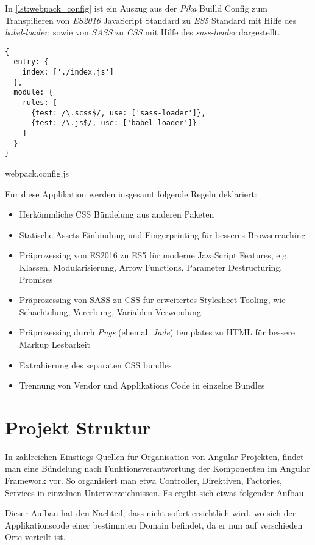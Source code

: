 In \ref{lst:webpack_config} ist ein Auszug aus der \textit{Pika} Builld Config zum Transpilieren von  \textit{ES2016} JavaScript Standard zu \textit{ES5} Standard mit Hilfe des \textit{babel-loader}, sowie von  \textit{SASS} zu \textit{CSS} mit Hilfe des \textit{sass-loader} dargestellt.


\begin{listing}[H]
\begin{verbatim}
{
  entry: {
    index: ['./index.js']
  },
  module: {
    rules: [
      {test: /\.scss$/, use: ['sass-loader']},
      {test: /\.js$/, use: ['babel-loader']}
    ]
  }
}
\end{verbatim}
\caption{webpack.config.js}
\label{lst:webpack_config}
\end{listing}

Für diese Applikation werden insgesamt folgende Regeln deklariert:

\begin{itemize}
 \item Herkömmliche CSS Bündelung aus anderen Paketen
 \item Statische Assets Einbindung und Fingerprinting für besseres Browsercaching
 \item Präprozessing von ES2016 zu ES5 für moderne JavaScript Features, e.g. Klassen, Modularisierung, Arrow Functions, Parameter Destructuring, Promises   
 \item Präprozessing von SASS zu CSS für erweitertes Stylesheet Tooling, wie Schachtelung, Vererbung, Variablen Verwendung
 \item Präprozessing durch \textit{Pugs} (ehemal. \textit{Jade}) templates zu HTML für bessere Markup Lesbarkeit
 \item Extrahierung des separaten CSS bundles
 \item Trennung von Vendor und Applikations Code in einzelne Bundles
\end{itemize}

\section{Projekt Struktur}

In zahlreichen Einstiegs Quellen für Organisation von Angular Projekten, findet man eine Bündelung nach Funktionsverantwortung der Komponenten im Angular Framework vor.
So organisiert man etwa Controller, Direktiven, Factories, Services in einzelnen Unterverzeichnissen. Es ergibt sich etwas folgender Aufbau

Dieser Aufbau hat den Nachteil, dass nicht sofort ersichtlich wird, wo sich der Applikationscode einer bestimmten Domain befindet, da er nun auf verschieden Orte verteilt ist. 

